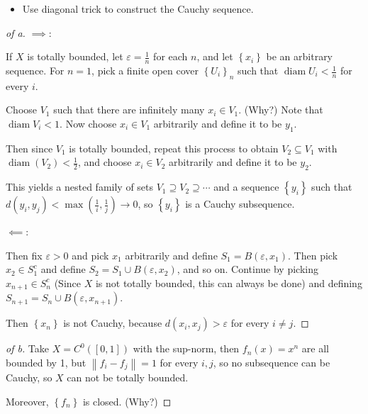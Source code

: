 \begin{solution}

\envlist

\begin{concept}

\envlist

\begin{itemize}
\tightlist
\item
  Use diagonal trick to construct the Cauchy sequence.
\end{itemize}

\end{concept}

\begin{proof}[of a]

\(\implies\):

If \(X\) is totally bounded, let \(\varepsilon = \frac 1 n\) for each
\(n\), and let \(\left\{{x_i}\right\}\) be an arbitrary sequence. For
\(n=1\), pick a finite open cover \(\left\{{U_i}\right\}_n\) such that
\({\operatorname{diam}}{U_i} < \frac 1 n\) for every \(i\).

Choose \(V_1\) such that there are infinitely many \(x_i \in V_1\).
(Why?) Note that \({\operatorname{diam}}V_i < 1\). Now choose
\(x_i \in V_1\) arbitrarily and define it to be \(y_1\).

Then since \(V_1\) is totally bounded, repeat this process to obtain
\(V_2 \subseteq V_1\) with \({\operatorname{diam}}(V_2)< \frac 1 2\),
and choose \(x_i \in V_2\) arbitrarily and define it to be \(y_2\).

This yields a nested family of sets
\(V_1 \supseteq V_2 \supseteq \cdots\) and a sequence
\(\left\{{y_i}\right\}\) such that
\(d(y_i, y_j) < \max(\frac 1 i, \frac 1 j) \to 0\), so
\(\left\{{y_i}\right\}\) is a Cauchy subsequence.

\(\impliedby\):

Then fix \(\varepsilon > 0\) and pick \(x_1\) arbitrarily and define
\(S_1 = B(\varepsilon, x_1)\). Then pick \(x_2 \in S_1^c\) and define
\(S_2 = S_1 \cup B(\varepsilon, x_2)\), and so on. Continue by picking
\(x_{n+1} \in S_n^c\) (Since \(X\) is not totally bounded, this can
always be done) and defining
\(S_{n+1} = S_n \cup B(\varepsilon, x_{n+1})\).

Then \(\left\{{x_n}\right\}\) is not Cauchy, because
\(d(x_i, x_j) > \varepsilon\) for every \(i\neq j\).

\end{proof}

\begin{proof}[of b]

Take \(X = C^0([0, 1])\) with the sup-norm, then \(f_n(x) = x^n\) are
all bounded by 1, but \({\left\lVert {f_i - f_j} \right\rVert} = 1\) for
every \(i, j\), so no subsequence can be Cauchy, so \(X\) can not be
totally bounded.

Moreover, \(\left\{{f_n}\right\}\) is closed. (Why?)

\end{proof}

\end{solution}

